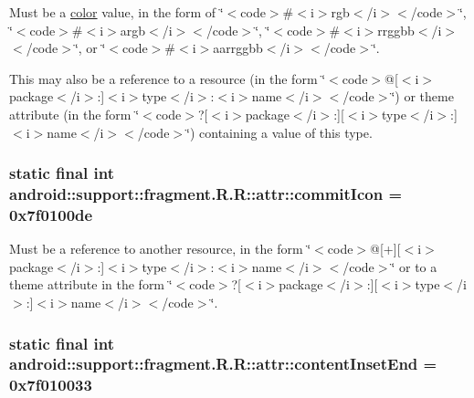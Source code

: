 Must be a \hyperlink{classandroid_1_1support_1_1fragment_1_1_r_1_1color}{color} value, in the form of \char`\"{}$<$code$>$\#$<$i$>$rgb$<$/i$>$$<$/code$>$\char`\"{}, \char`\"{}$<$code$>$\#$<$i$>$argb$<$/i$>$$<$/code$>$\char`\"{}, \char`\"{}$<$code$>$\#$<$i$>$rrggbb$<$/i$>$$<$/code$>$\char`\"{}, or \char`\"{}$<$code$>$\#$<$i$>$aarrggbb$<$/i$>$$<$/code$>$\char`\"{}. 

This may also be a reference to a resource (in the form \char`\"{}$<$code$>$@\mbox{[}$<$i$>$package$<$/i$>$:\mbox{]}$<$i$>$type$<$/i$>$:$<$i$>$name$<$/i$>$$<$/code$>$\char`\"{}) or theme attribute (in the form \char`\"{}$<$code$>$?\mbox{[}$<$i$>$package$<$/i$>$:\mbox{]}\mbox{[}$<$i$>$type$<$/i$>$:\mbox{]}$<$i$>$name$<$/i$>$$<$/code$>$\char`\"{}) containing a value of this type. \hypertarget{classandroid_1_1support_1_1fragment_1_1_r_1_1attr_b086b2f3ad3a08584b52ac9390869008}{
\subsubsection[{commitIcon}]{\setlength{\rightskip}{0pt plus 5cm}static final int android::support::fragment.R.R::attr::commitIcon = 0x7f0100de}}
\label{classandroid_1_1support_1_1fragment_1_1_r_1_1attr_b086b2f3ad3a08584b52ac9390869008}


Must be a reference to another resource, in the form \char`\"{}$<$code$>$@\mbox{[}+\mbox{]}\mbox{[}$<$i$>$package$<$/i$>$:\mbox{]}$<$i$>$type$<$/i$>$:$<$i$>$name$<$/i$>$$<$/code$>$\char`\"{} or to a theme attribute in the form \char`\"{}$<$code$>$?\mbox{[}$<$i$>$package$<$/i$>$:\mbox{]}\mbox{[}$<$i$>$type$<$/i$>$:\mbox{]}$<$i$>$name$<$/i$>$$<$/code$>$\char`\"{}. \hypertarget{classandroid_1_1support_1_1fragment_1_1_r_1_1attr_7f62139a3e76153acf9538a7582e0196}{
\subsubsection[{contentInsetEnd}]{\setlength{\rightskip}{0pt plus 5cm}static final int android::support::fragment.R.R::attr::contentInsetEnd = 0x7f010033}}
\label{classandroid_1_1support_1_1fragment_1_1_r_1_1attr_7f62139a3e76153acf9538a7582e0196}


